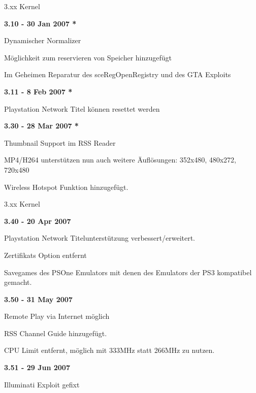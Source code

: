 \documentclass[mode=print,paper=screen,size=10pt,style=paintings]{powerdot}
\begin{document}
\begin{slide}{3.xx Kernel}
	\begin{large}\textbf{3.10 - 30 Jan 2007 *}\end{large}
	\begin{list}{-}{}
		\item{Dynamischer Normalizer}
		\item{Möglichkeit zum reservieren von Speicher hinzugefügt}
		\item{Im Geheimen Reparatur des sceRegOpenRegistry und des GTA Exploits}
	\end{list}
	\begin{large}\textbf{3.11 - 8 Feb 2007 *}\end{large}
	\begin{list}{-}{}
		\item{Playstation Network Titel können resettet werden}
	\end{list}
	\begin{large}\textbf{3.30 - 28 Mar 2007 *}\end{large}
	\begin{list}{-}{}
		\item{Thumbnail Support im RSS Reader}
		\item{MP4/H264 unterstützen nun auch weitere Äuflösungen: 352x480, 480x272, 720x480}
		\item{Wireless Hotspot Funktion hinzugefügt.}
	\end{list}
\end{slide}

\begin{slide}{3.xx Kernel}
	\begin{large}\textbf{3.40 - 20 Apr 2007}\end{large}
	\begin{list}{-}{}
		\item{Playstation Network Titelunterstützung verbessert/erweitert.}
		\item{Zertifikats Option entfernt}
		\item{Savegames des PSOne Emulators mit denen des Emulators der PS3 kompatibel gemacht.}
	\end{list}
	\begin{large}\textbf{3.50 - 31 May 2007}\end{large}
	\begin{list}{-}{}
		\item{Remote Play via Internet möglich}
		\item{RSS Channel Guide hinzugefügt.}
		\item{CPU Limit entfernt, möglich mit 333MHz statt 266MHz zu nutzen.}
	\end{list}
	\begin{large}\textbf{3.51 - 29 Jun 2007}\end{large}
	\begin{list}{-}{}
		\item{Illuminati Exploit gefixt}
	\end{list}
\end{slide}
\end{document}
